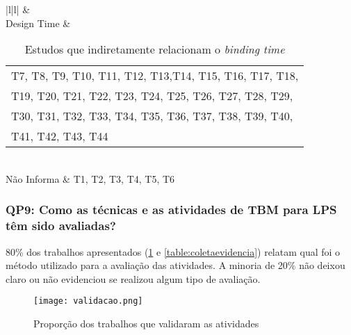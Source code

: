 \begin{table}[]
	\centering
	\caption{Estudos que indiretamente relacionam o \textit{binding time}}
	\label{table:binding}
	\begin{tabular}{|l|l|}
		\hline
		 &  \\ \hline
		Design Time & \begin{tabular}[c]{@{}l@{}}T7, T8, T9, T10, T11, T12, T13,T14, T15, T16, T17, T18,\\ T19, T20, T21, T22, T23, T24, T25, T26, T27, T28, T29,\\ T30, T31, T32, T33, T34, T35, T36, T37, T38, T39, T40,\\ T41, T42, T43, T44\end{tabular} \\ \hline
		Não Informa & T1, T2, T3, T4, T5, T6 \\ \hline
	\end{tabular}
\end{table}


\subsubsection{QP9: Como as técnicas e as atividades de TBM para LPS têm sido avaliadas?}
80\% dos trabalhos apresentados (\ref{fig:validacao} e \ref{table:coletaevidencia}) relatam qual foi o método utilizado para a avaliação das atividades. A minoria de 20\% não deixou claro ou não evidenciou se realizou algum tipo de avaliação.

\begin{figure}[htb]
	\centering
	\texttt{[image: validacao.png]}
	\caption{Proporção dos trabalhos que validaram as atividades}
	\label{fig:validacao}
\end{figure}


